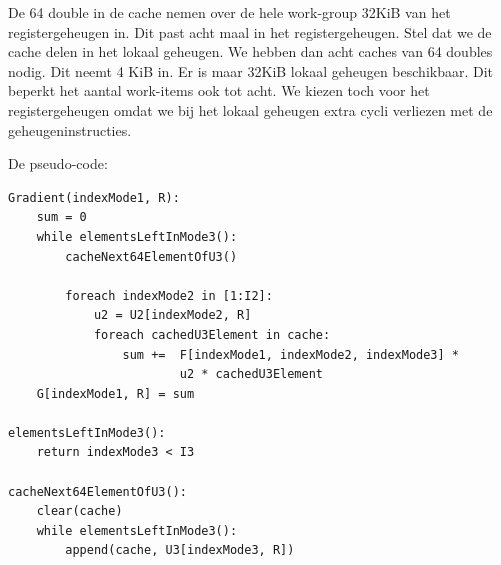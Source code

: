 De 64 double in de cache nemen over de hele work-group 32KiB van het registergeheugen in. Dit past acht maal in het registergeheugen. Stel dat we de cache delen in het lokaal geheugen. We hebben dan acht caches van 64 doubles nodig. Dit neemt 4 KiB in. Er is maar 32KiB lokaal geheugen beschikbaar. Dit beperkt het aantal work-items ook tot acht. We kiezen toch voor het registergeheugen omdat we bij het lokaal geheugen extra cycli verliezen met de geheugeninstructies.

De pseudo-code:

\begin{lstlisting}
Gradient(indexMode1, R):
	sum = 0
	while elementsLeftInMode3():
		cacheNext64ElementOfU3()
		
		foreach indexMode2 in [1:I2]:
			u2 = U2[indexMode2, R]
			foreach cachedU3Element in cache:
				sum += 	F[indexMode1, indexMode2, indexMode3] *
						u2 * cachedU3Element
	G[indexMode1, R] = sum

elementsLeftInMode3():
	return indexMode3 < I3

cacheNext64ElementOfU3():
	clear(cache)
	while elementsLeftInMode3():
		append(cache, U3[indexMode3, R])
\end{lstlisting}
